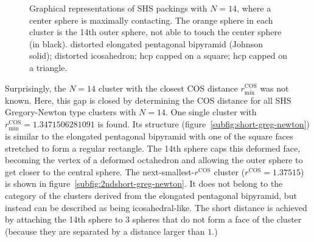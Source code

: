 \begin{figure}
    \caption{Graphical representations of \acs{SHS} packings with $N=14$, where
    a center sphere is maximally contacting. The orange sphere in each cluster
    is the 14th outer sphere, not able to touch the center sphere (in black).
    \protect{} distorted elongated pentagonal
    bipyramid (Johnson solid); \protect{}
    distorted icosahedron; \protect{} hcp capped
    on a square; \protect{} hcp capped on a
    triangle.}
    \label{fig:N14}
\end{figure}

Surprisingly, the $N = 14$ cluster with the closest \ac{COS} distance
$r_\text{min}^\text{COS}$ was not known. Here, this gap is closed by determining
the \ac{COS} distance for all \ac{SHS} Gregory-Newton type clusters with $N=14$.
One single cluster with $r_\text{min}^\text{COS}=1.3471506281091$ is found.  Its
structure (figure~\ref{subfig:short-greg-newton}) is similar to the elongated
pentagonal bipyramid with one of the square faces stretched to form a regular
rectangle. The 14th sphere caps this deformed face, becoming the vertex of a
deformed octahedron and allowing the outer sphere to get closer to the central
sphere.  The next-smallest-$r^\text{COS}$ cluster ($r^\text{COS} = 1.37515$) is
shown in figure~\ref{subfig:2ndshort-greg-newton}. It does not belong to the
category of the clusters derived from the elongated pentagonal bipyramid, but
instead can be described as being icosahedral-like.  The short distance is
achieved by attaching the 14th sphere to 3 spheres that do not form a face of
the cluster (because they are separated by a distance larger than $1$.)

